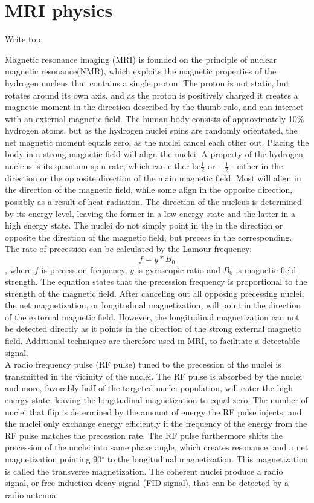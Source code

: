 \section{MRI physics}

 {\Large Write top}
 
Magnetic resonance imaging (MRI) is founded on the principle of nuclear magnetic resonance(NMR), which exploits the magnetic properties of the hydrogen nucleus that contains a single proton. The proton is not static, but rotates around its own axis, and as the proton is positively charged it creates a magnetic moment in the direction described by the thumb rule, and can interact with an external magnetic field. The human body consists of approximately 10\% hydrogen atoms, but as the hydrogen nuclei spins are randomly orientated, the net magnetic moment equals zero, as the nuclei cancel each other out. Placing the body in a strong magnetic field will align the nuclei. A property of the hydrogen nucleus is its quantum spin rate, which can either be$ \frac{1}{2}$ or $- \frac{1}{2}$ - either in the direction or the opposite direction of the main magnetic field. Most will align in the direction of the magnetic field, while some align in the opposite direction, possibly as a result of heat radiation. The direction of the nucleus is determined by its energy level, leaving the former in a low energy state and the latter in a high energy state. The nuclei do not simply point in the in the direction or opposite the direction of the magnetic field, but precess in the corresponding. The rate of precession can be calculated by the Lamour frequency: \[f=y*B_0\]
, where $f$ is precession frequency, $y$ is gyroscopic ratio and $B_0$ is magnetic field strength. The equation states that the precession frequency is proportional to the strength of the magnetic field. After canceling out all opposing precessing nuclei, the net magnetization, or longitudinal magnetization, will point in the direction of the external magnetic field. However, the longitudinal magnetization can not be detected directly as it points in the direction of the strong external magnetic field. Additional techniques are therefore used in MRI, to facilitate a detectable signal. \\
A radio frequency pulse (RF pulse) tuned to the precession of the nuclei is transmitted in the vicinity of the nuclei. The RF pulse is absorbed by the nuclei and more, favorably half of the targeted nuclei population, will enter the high energy state, leaving the longitudinal magnetization to equal zero. The number of nuclei that flip is determined by the amount of energy the RF pulse injects, and the nuclei only exchange energy efficiently if the frequency of the energy from the RF pulse matches the precession rate. The RF pulse furthermore shifts the precession of the nuclei into same phase angle, which creates resonance, and a net magnetization pointing 90$^\circ$ to the longitudinal magnetization. This magnetization is called the transverse magnetization. The coherent nuclei produce a radio signal, or free induction decay signal (FID signal), that can be detected by a radio antenna. 
